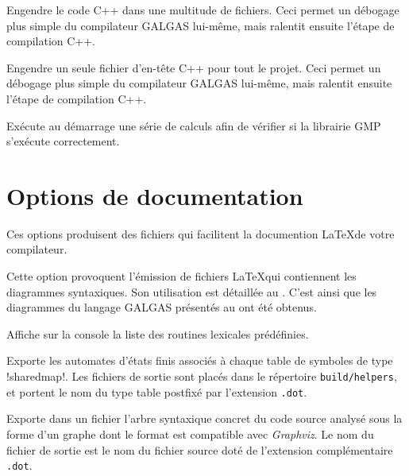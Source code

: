  Engendre le code C++ dans une multitude de fichiers. Ceci permet un débogage plus simple du compilateur GALGAS lui-même, mais ralentit ensuite l'étape de compilation C++.


 Engendre un seule fichier d'en-tête C++ pour tout le projet. Ceci permet un débogage plus simple du compilateur GALGAS lui-même, mais ralentit ensuite l'étape de compilation C++.


 Exécute au démarrage une série de calculs afin de vérifier si la librairie GMP s'exécute correctement.





\section{Options de documentation}

Ces options produisent des fichiers qui facilitent la documention \LaTeX de votre compilateur.

 Cette option provoquent l'émission de fichiers \LaTeX qui contiennent les diagrammes syntaxiques. Son utilisation est détaillée au . C'est ainsi que les diagrammes du langage GALGAS présentés au  ont été obtenus.





 Affiche sur la console la liste des routines lexicales prédéfinies.




 Exporte les automates d'états finis associés à chaque table de symboles de type \ggs!sharedmap!. Les fichiers de sortie sont placés dans le répertoire \texttt{build/helpers}, et portent le nom du type table postfixé par l'extension \texttt{.dot}.





 Exporte dans un fichier l'arbre syntaxique concret du code source analysé sous la forme d'un graphe dont le format est compatible avec \emph{Graphviz}. Le nom du fichier de sortie est le nom du fichier source doté de l'extension complémentaire \texttt{.dot}.


